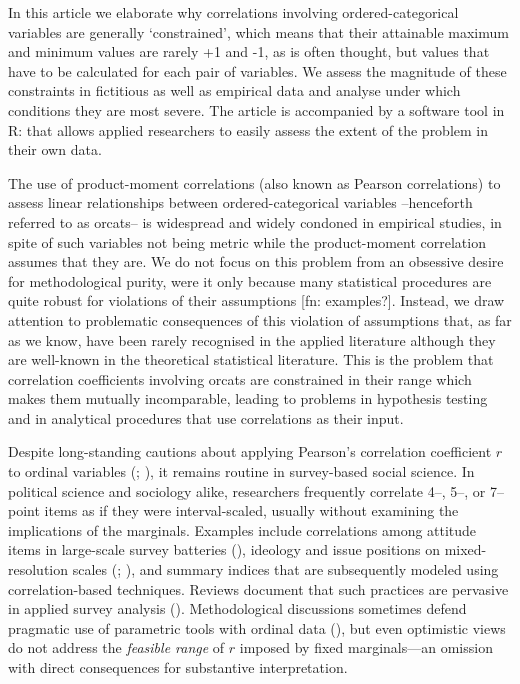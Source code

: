 \documentclass[
  12pt,
]{article}
\theoremstyle{plain}
\theoremstyle{definition}
\theoremstyle{remark}
\begin{document}
In this article we elaborate why correlations involving
ordered-categorical variables are generally `constrained', which means
that their attainable maximum and minimum values are rarely +1 and -1,
as is often thought, but values that have to be calculated for each pair
of variables. We assess the magnitude of these constraints in fictitious
as well as empirical data and analyse under which conditions they are
most severe. The article is accompanied by a software tool in R: that
allows applied researchers to easily assess the extent of the problem in
their own data.

The use of product-moment correlations (also known as Pearson
correlations) to assess linear relationships between ordered-categorical
variables --henceforth referred to as orcats-- is widespread and widely
condoned in empirical studies, in spite of such variables not being
metric while the product-moment correlation assumes that they are. We do
not focus on this problem from an obsessive desire for methodological
purity, were it only because many statistical procedures are quite
robust for violations of their assumptions {[}fn: examples?{]}. Instead,
we draw attention to problematic consequences of this violation of
assumptions that, as far as we know, have been rarely recognised in the
applied literature although they are well-known in the theoretical
statistical literature. This is the problem that correlation
coefficients involving orcats are constrained in their range which makes
them mutually incomparable, leading to problems in hypothesis testing
and in analytical procedures that use correlations as their input.

Despite long-standing cautions about applying Pearson's correlation
coefficient \(r\) to ordinal variables
(;
), it remains routine in
survey-based social science. In political science and sociology alike,
researchers frequently correlate 4--, 5--, or 7--point items as if they
were interval-scaled, usually without examining the implications of the
marginals. Examples include correlations among attitude items in
large-scale survey batteries (), ideology and issue positions on mixed-resolution
scales (;
), and summary indices that
are subsequently modeled using correlation-based techniques. Reviews
document that such practices are pervasive in applied survey analysis
().
Methodological discussions sometimes defend pragmatic use of parametric
tools with ordinal data (),
but even optimistic views do not address the \emph{feasible range} of
\(r\) imposed by fixed marginals---an omission with direct consequences
for substantive interpretation.
\end{document}
